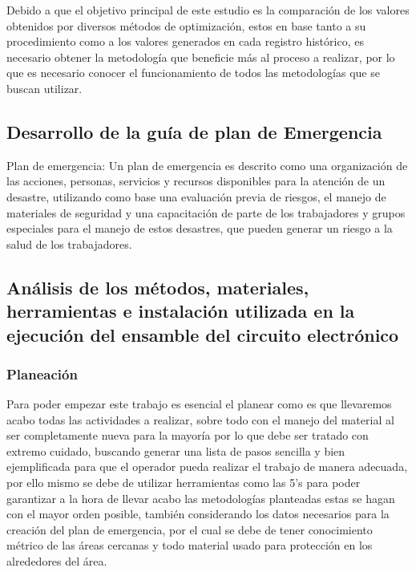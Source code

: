     
        Debido a que el objetivo principal de este estudio es la comparación de los valores obtenidos por diversos métodos de optimización, estos en base tanto a su procedimiento como a los valores generados en cada registro histórico, es necesario obtener la metodología que beneficie más al proceso a realizar, por lo que es necesario conocer el funcionamiento de todos las metodologías que se buscan utilizar. 
        
        \subsection{Desarrollo de la guía de plan de Emergencia}

        Plan de emergencia: Un plan de emergencia es descrito como una organización de las acciones, personas, servicios y recursos disponibles para la atención de un desastre, utilizando como base una evaluación previa de riesgos, el manejo de materiales de seguridad y una capacitación de parte de los trabajadores y grupos especiales para el manejo de estos desastres, que pueden generar un riesgo a la salud de los trabajadores.\cite{PlanEmer}

        \subsection{Análisis de los métodos, materiales, herramientas e instalación utilizada en la ejecución del ensamble del circuito electrónico}

        \subsubsection{Planeación}

        Para poder empezar este trabajo es esencial el planear como es que llevaremos acabo todas las actividades a realizar, sobre todo con el manejo del material al ser completamente nueva para la mayoría por lo que debe ser tratado con extremo cuidado, buscando generar una lista de pasos sencilla y bien ejemplificada para que el operador pueda realizar el trabajo de manera adecuada, por ello mismo se debe de utilizar herramientas como las 5's para poder garantizar a la hora de llevar acabo las metodologías planteadas estas se hagan con el mayor orden posible, también considerando los datos necesarios para la creación del plan de emergencia, por el cual se debe de tener conocimiento métrico de las áreas cercanas y todo material usado para protección en los alrededores del área.

